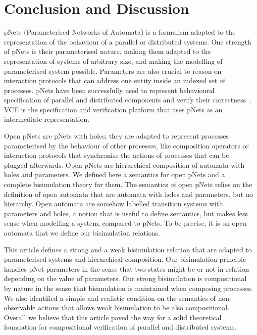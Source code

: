 \documentclass{elsarticle}
\begin{document}


\section{Conclusion and Discussion}
\label{section:conclusion}
 pNets (Parameterised Networks of Automata) is a formalism adapted to the representation of the behaviour of a parallel or distributed systems. One  strength of pNets is their parameterised nature, making them adapted to the representation of systems of arbitrary size, and making the modelling of parameterised system possible. Parameters are also crucial to reason on interaction protocols that can address one entity inside an indexed set of processes. pNets have been successfully used to represent behavioural specification of parallel and distributed components and verify their correctness~\cite{AmeurBoulifa2017,HKM-FASE16}. VCE is the specification and verification platform that uses pNets as an intermediate representation.

Open pNets are pNets with holes; they are adapted to represent processes parameterised by the behaviour of other processes, like composition operators or interaction 
protocols that synchronise the actions of processes that can be plugged afterwards. Open
pNets are hierarchical composition of automata with holes and parameters. We
defined here a semantics for open pNets and a complete bisimulation theory for them. 
The semantics of open pNets relies on the definition of open automata that are automata with holes and parameters, but no hierarchy. Open automata are somehow labelled transition systems with parameters and holes, a notion that is useful to define semantics, but makes less sense when modelling a system, compared to pNets. To be precise, it is on open automata that we define our bisimulation relations.

This article defines a strong and a weak bisimulation relation that are adapted to parameterised systems and hierarchical composition. Our bisimulation principle handles pNet parameters in the sense that two states might be or not in relation depending on the value of parameters. Our strong  bisimulation is compositional by nature in the sense that bisimulation is maintained when composing processes. We also identified a simple and realistic condition on the semantics of non-observable actions that allows weak bisimulation to be also compositional. Overall we believe that this article paved the way for a solid theoretical foundation for compositional verification of parallel and distributed systems.
\end{document}
